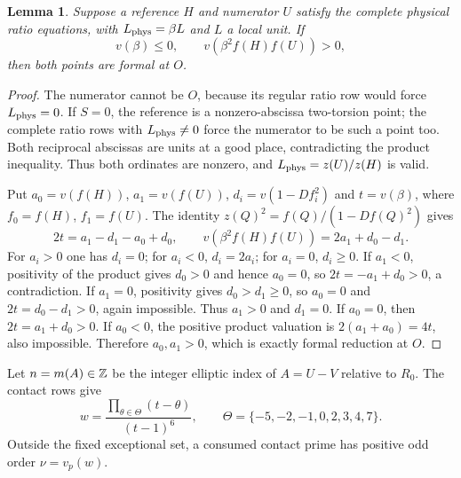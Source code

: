 \documentclass[11pt,a4paper]{article}
\newtheorem{lemma}[theorem]{Lemma}
\begin{document}
\begin{lemma}\label{lem:branches}
Suppose a reference $H$ and numerator $U$ satisfy the complete
physical ratio equations, with $L_{\rm phys}=\beta L$ and $L$ a
local unit. If
\[
 v(\beta)\le0,\qquad v(\beta^2f(H)f(U))>0,
\]
then both points are formal at $O$.
\end{lemma}
\begin{proof}
The numerator cannot be $O$, because its regular ratio row would
force $L_{\rm phys}=0$. If $S=0$, the reference is a nonzero-abscissa
two-torsion point; the complete ratio rows with
$L_{\rm phys}\ne0$ force the numerator to be such a point too.
Both reciprocal abscissas are units at a good place, contradicting
the product inequality. Thus both ordinates are nonzero, and
$L_{\rm phys}=z(U)/z(H)$ is valid.

Put $a_0=v(f(H))$, $a_1=v(f(U))$,
$d_i=v(1-D f_i^2)$ and $t=v(\beta)$, where $f_0=f(H)$,
$f_1=f(U)$. The identity $z(Q)^2=f(Q)/(1-Df(Q)^2)$ gives
\[
 2t=a_1-d_1-a_0+d_0,\qquad
 v(\beta^2f(H)f(U))=2a_1+d_0-d_1.
\]
For $a_i>0$ one has $d_i=0$; for $a_i<0$, $d_i=2a_i$;
for $a_i=0$, $d_i\ge0$.
If $a_1<0$, positivity of the product gives $d_0>0$ and hence
$a_0=0$, so $2t=-a_1+d_0>0$, a contradiction.
If $a_1=0$, positivity gives $d_0>d_1\ge0$, so $a_0=0$ and
$2t=d_0-d_1>0$, again impossible.
Thus $a_1>0$ and $d_1=0$. If $a_0=0$, then
$2t=a_1+d_0>0$. If $a_0<0$, the positive product valuation is
$2(a_1+a_0)=4t$, also impossible. Therefore $a_0,a_1>0$,
which is exactly formal reduction at $O$.
\end{proof}

Let $n=m(A)\in\mathbb Z$ be the integer elliptic index of $A=U-V$
relative to $R_0$.
The contact rows give
\[
 w=\frac{\prod_{\theta\in\Theta}(t-\theta)}{(t-1)^6},
 \qquad\Theta=\{-5,-2,-1,0,2,3,4,7\}.
\]
Outside the fixed exceptional set, a consumed contact prime has
positive odd order $\nu=v_p(w)$.
\end{document}
